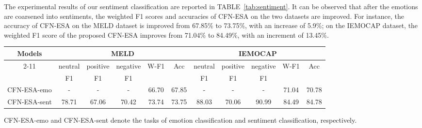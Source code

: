 \documentclass[journal]{IEEEtran}
\begin{document}
The experimental results of our sentiment classification are reported in TABLE~\ref{tab:sentiment}. It can be observed that after the emotions are coarsened into sentiments, the weighted F1 scores and accuracies of CFN-ESA on the two datasets are improved. For instance, the accuracy of CFN-ESA on the MELD dataset is improved from 67.85\% to 73.75\%, with an increase of 5.9\%; on the IEMOCAP dataset, the weighted F1 score of the proposed CFN-ESA improves from 71.04\% to 84.49\%, with an increment of 13.45\%. 
\begin{table*}[htbp]
    \centering
    \renewcommand{\arraystretch}{1.0}
    \setlength{\tabcolsep}{7pt}
    \caption{Experimental Results for Sentiment Classification on the Two Datasets}
    \begin{threeparttable}
    \begin{tabular}{c|ccc|cc||ccc|cc}
    \hline
    \multirow{2}{*}{\textbf{Models}} &\multicolumn{5}{c||}{MELD} &\multicolumn{5}{c}{IEMOCAP}\\
    \cline{2-11}
           &neutral &positive &negative &\multirow{2}{*}{W-F1} &\multirow{2}{*}{Acc} &neutral &positive &negative &\multirow{2}{*}{W-F1} &\multirow{2}{*}{Acc}\\ 
		   &F1 &F1 &F1 & & &F1 &F1 &F1 & & \\
	\hline
	CFN-ESA-emo &- &- &- &66.70 &67.85 &- &- &- &71.04 &70.78 \\
    CFN-ESA-sent &78.71 &67.06 &70.42 &73.74 &73.75 &88.03 &70.06 &90.99 &84.49 &84.78 \\
	\hline
    \end{tabular}
    \begin{tablenotes}
        \footnotesize
        \item CFN-ESA-emo and CFN-ESA-sent denote the tasks of emotion classification and sentiment classification, respectively.
    \end{tablenotes}
    \end{threeparttable}
    \label{tab:sentiment}
\end{table*}
\end{document}
